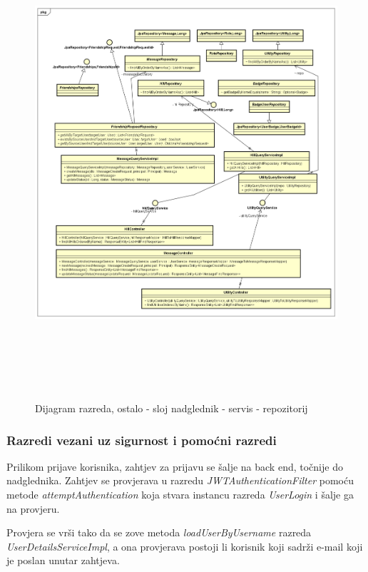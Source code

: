 			\begin{figure}[H]
				\includegraphics[scale=0.6, height=175mm, width=165mm]{dijagrami/csr-other-dijagram} %
				\centering
				\caption{Dijagram razreda, ostalo - sloj nadglednik - servis - repozitorij}
				\label{fig:dijagrami_razreda_ostalo}
			\end{figure}
			\newpage
			\subsubsection{Razredi vezani uz sigurnost i pomoćni razredi}
			Prilikom prijave korisnika, zahtjev za prijavu se šalje na back end, točnije do nadglednika. Zahtjev se provjerava u razredu \textit{JWTAuthenticationFilter} pomoću metode \textit{attemptAuthentication} koja stvara instancu razreda \textit{UserLogin} i šalje ga na provjeru.
			 
			 Provjera se vrši tako da se zove metoda \textit{loadUserByUsername} razreda \textit{UserDetailsServiceImpl}, a ona provjerava postoji li korisnik koji sadrži e-mail koji je poslan unutar zahtjeva. 
			 
